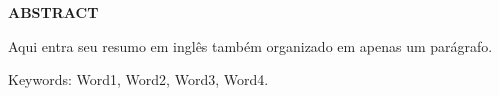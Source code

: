 \begin{center}
\textbf{ABSTRACT}
\end{center}

$\!$\\


Aqui entra seu resumo em inglês também organizado em apenas um parágrafo.

\vspace{1cm}

\hspace{-1.3cm}Keywords: Word1, Word2, Word3, Word4.